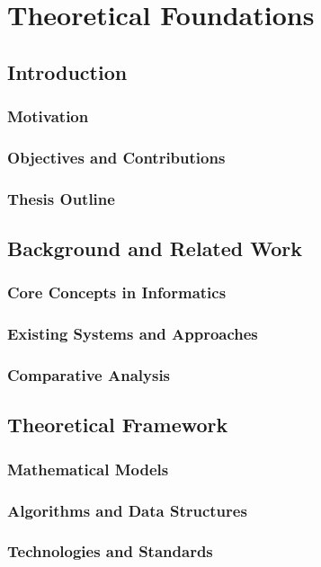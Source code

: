 \documentclass[11pt]{report}
\begin{document}

\part{Theoretical Foundations}

\chapter{Introduction}
\section{Motivation}
\section{Objectives and Contributions}
\section{Thesis Outline}

\chapter{Background and Related Work}
\section{Core Concepts in Informatics}
\section{Existing Systems and Approaches}
\section{Comparative Analysis}

\chapter{Theoretical Framework}
\section{Mathematical Models}
\section{Algorithms and Data Structures}
\section{Technologies and Standards}
\end{document}
